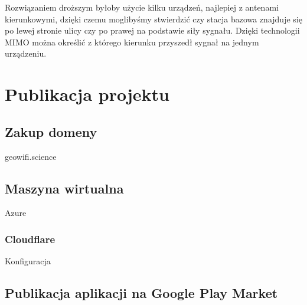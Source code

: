 Rozwiązaniem droższym byłoby użycie kilku urządzeń, najlepiej z antenami kierunkowymi, dzięki czemu moglibyśmy stwierdzić czy stacja bazowa znajduje się po lewej stronie ulicy czy po prawej na podstawie siły sygnału.
Dzięki technologii MIMO można określić z którego kierunku przyszedł sygnał na jednym urządzeniu.


\section{Publikacja projektu}
\subsection{Zakup domeny}
geowifi.science
\subsection{Maszyna wirtualna}
Azure
\subsubsection{Cloudflare}
Konfiguracja
\subsection{Publikacja aplikacji na Google Play Market} %
